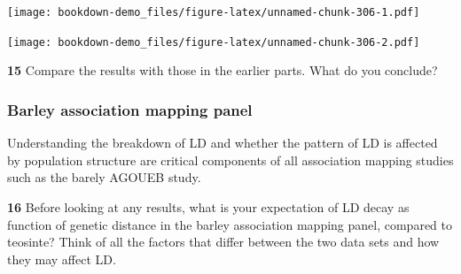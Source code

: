 \documentclass[
]{book}
\makeatletter
\newenvironment{Shaded}{\begin{snugshade}}{\end{snugshade}}
\newcommand{\AttributeTok}[1]{\textcolor[rgb]{0.77,0.63,0.00}{#1}}
\newcommand{\DecValTok}[1]{\textcolor[rgb]{0.00,0.00,0.81}{#1}}
\newcommand{\FloatTok}[1]{\textcolor[rgb]{0.00,0.00,0.81}{#1}}
\newcommand{\FunctionTok}[1]{\textcolor[rgb]{0.00,0.00,0.00}{#1}}
\newcommand{\NormalTok}[1]{#1}
\newcommand{\OtherTok}[1]{\textcolor[rgb]{0.56,0.35,0.01}{#1}}
\newcommand{\SpecialCharTok}[1]{\textcolor[rgb]{0.00,0.00,0.00}{#1}}
\newcommand{\StringTok}[1]{\textcolor[rgb]{0.31,0.60,0.02}{#1}}
\newenvironment{kframe}{%
\medskip{}
\setlength{\fboxsep}{.8em}
 \def\at@end@of@kframe{}%
 \ifinner\ifhmode%
  \def\at@end@of@kframe{\end{minipage}}%
  \begin{minipage}{\columnwidth}%
 \fi\fi%
 \def\FrameCommand##1{\hskip\@totalleftmargin \hskip-\fboxsep
 \colorbox{shadecolor}{##1}\hskip-\fboxsep
     \hskip-\linewidth \hskip-\@totalleftmargin \hskip\columnwidth}%
 \MakeFramed {\advance\hsize-\width
   \@totalleftmargin\z@ \linewidth\hsize
   \@setminipage}}%
 {\par\unskip\endMakeFramed%
 \at@end@of@kframe}
\newenvironment{rmdblock}[1]
  {
  \begin{itemize}
  \renewcommand{\labelitemi}{
    \raisebox{-.7\height}[0pt][0pt]{
      {\setkeys{Gin}{width=3em,keepaspectratio}\texttt{[image: images/\#1]}}
    }
  }
  \setlength{\fboxsep}{1em}
  \begin{kframe}
  \item
  }
  {
  \end{kframe}
  \end{itemize}
  }
\newenvironment{rmdquiz}
  {\begin{rmdblock}{quiz}}
  {\end{rmdblock}}
\makeatother
\begin{document}
\texttt{[image: bookdown-demo\_files/figure-latex/unnamed-chunk-306-1.pdf]}

\begin{Shaded}
\end{Shaded}

\texttt{[image: bookdown-demo\_files/figure-latex/unnamed-chunk-306-2.pdf]}

\begin{rmdquiz}
\textbf{15}
Compare the results with those in the earlier parts. What do you conclude?
\end{rmdquiz}

\hypertarget{barley-association-mapping-panel}{%
\subsubsection{Barley association mapping panel}\label{barley-association-mapping-panel}}

Understanding the breakdown of LD and whether the pattern of LD is affected by population structure are critical components of all association mapping studies such as the barely AGOUEB study.

\begin{rmdquiz}
\textbf{16}
Before looking at any results, what is your expectation of LD decay as function of genetic distance in the barley association mapping panel, compared to teosinte? Think of all the factors that differ between the two data sets and how they may affect LD.
\end{rmdquiz}
\end{document}
